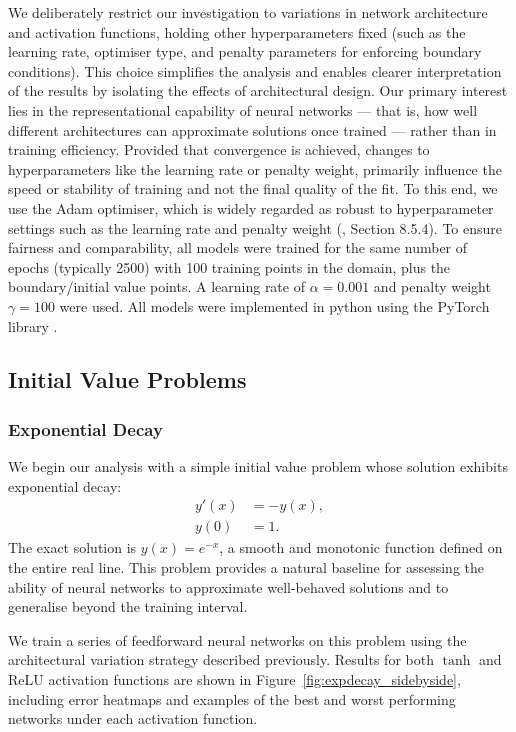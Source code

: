 We deliberately restrict our investigation to variations in network architecture and activation 
functions, holding other hyperparameters fixed (such as the learning rate, optimiser type, and 
penalty parameters for enforcing boundary conditions). This choice simplifies the analysis and 
enables clearer interpretation of the results by isolating the effects of architectural design. 
Our primary interest lies in the representational capability of neural networks — that is, how 
well different architectures can approximate solutions once trained — rather than in training 
efficiency. Provided that convergence is achieved, changes to hyperparameters like the learning 
rate or penalty weight, primarily influence the speed or stability of training and not the final quality 
of the fit. To this end, we use the Adam optimiser, which is widely regarded as robust to 
hyperparameter settings such as the learning rate and penalty weight (\cite{goodfellow2016deep},
Section 8.5.4). To ensure fairness and comparability, all models were trained for the same 
number of epochs (typically 2500) with 100 training points in the domain, plus the 
boundary/initial value points. A learning rate of $\alpha = 0.001$ and penalty weight 
$\gamma = 100$ were used. All 
models were implemented in python using the PyTorch library \cite{paszke2017automatic}.


\subsection{Initial Value Problems}\label{sec:IVPs}

\subsubsection{Exponential Decay}

We begin our analysis with a simple initial value problem whose solution exhibits exponential decay:
\[
\begin{aligned}
    y'(x) &= -y(x), \\
    y(0) &= 1.
\end{aligned}
\]
The exact solution is \( y(x) = e^{-x} \), a smooth and monotonic function defined on the entire real
line. This problem provides a natural baseline for assessing the ability of neural networks to 
approximate well-behaved solutions and to generalise beyond the training interval.

We train a series of feedforward neural networks on this problem using the architectural variation 
strategy described previously. Results for 
both \(\tanh\) and ReLU activation functions are shown in Figure~\ref{fig:expdecay_sidebyside}, 
including error heatmaps and examples of the best and worst performing networks under each 
activation function.

